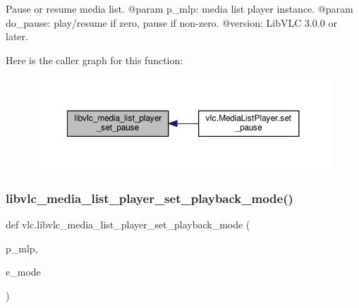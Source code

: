 \begin{DoxyVerb}Pause or resume media list.
@param p_mlp: media list player instance.
@param do_pause: play/resume if zero, pause if non-zero.
@version: LibVLC 3.0.0 or later.
\end{DoxyVerb}
 Here is the caller graph for this function\+:
\nopagebreak
\begin{figure}[H]
\begin{center}
\leavevmode
\includegraphics[width=350pt]{namespacevlc_ab9597e2c2fd5fb8a8ea9f1c259796605_icgraph}
\end{center}
\end{figure}
\mbox{\label{namespacevlc_a31fd24c2a75a7af7b6f1d19de6b66e21}} 
\subsubsection{\texorpdfstring{libvlc\+\_\+media\+\_\+list\+\_\+player\+\_\+set\+\_\+playback\+\_\+mode()}{libvlc\_media\_list\_player\_set\_playback\_mode()}}
{\footnotesize\ttfamily def vlc.\+libvlc\+\_\+media\+\_\+list\+\_\+player\+\_\+set\+\_\+playback\+\_\+mode (\begin{DoxyParamCaption}\item[{}]{p\+\_\+mlp,  }\item[{}]{e\+\_\+mode }\end{DoxyParamCaption})}

